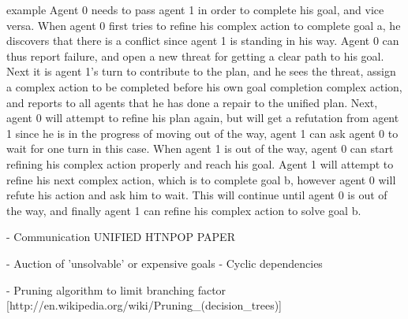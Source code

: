 \documentclass[Main]{subfiles}
\begin{document}
example
Agent 0 needs to pass agent 1 in order to complete his goal, and vice versa.
When agent 0 first tries to refine his complex action to complete goal a, he discovers that there is a conflict since agent 1 is standing in his way. Agent 0 can thus report failure, and open a new threat for getting a clear path to his goal. Next it is agent 1's turn to contribute to the plan, and he sees the threat, assign a complex action to be completed before his own goal completion complex action, and reports to all agents that he has done a repair to the unified plan. Next, agent 0 will attempt to refine his plan again, but will get a refutation from agent 1 since he is in the progress of moving out of the way, agent 1 can ask agent 0 to wait for one turn in this case. When agent 1 is out of the way, agent 0 can start refining his complex action properly and reach his goal. Agent 1 will attempt to refine his next complex action, which is to complete goal b, however agent 0 will refute his action and ask him to wait. This will continue until agent 0 is out of the way, and finally agent 1 can refine his complex action to solve goal b.


- Communication
UNIFIED HTNPOP PAPER

- Auction of 'unsolvable' or expensive goals \cite{VanderKrogt2005}
  - Cyclic dependencies 


- Pruning algorithm to limit branching factor [http://en.wikipedia.org/wiki/Pruning_(decision_trees)]
\end{document}
